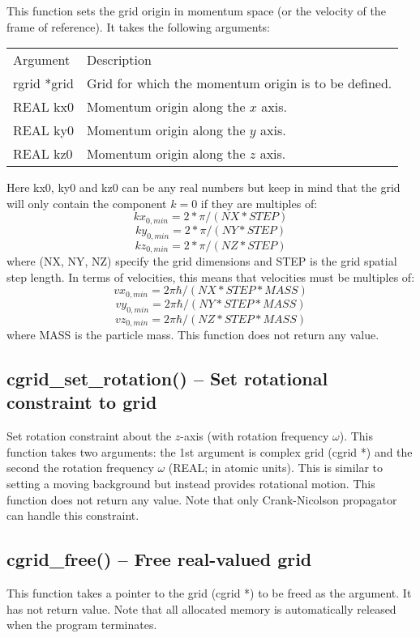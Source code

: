 \documentclass[12pt,letterpaper]{report}
\begin{document}
This function sets the grid origin in momentum space (or the velocity of the frame of reference). It takes the following arguments:
\begin{longtable}{p{} p{}}
Argument & Description\\
\cline{1-2}
rgrid *grid & Grid for which the momentum origin is to be defined.\\
REAL kx0 & Momentum origin along the $x$ axis.\\
REAL ky0 & Momentum origin along the $y$ axis.\\
REAL kz0 & Momentum origin along the $z$ axis.\\
\end{longtable}
\noindent
Here kx0, ky0 and kz0 can be any real numbers but keep in mind that the grid will only contain the component $k = 0$ if they are multiples of:
$$kx_{0,min} = 2 * \pi / (NX * STEP)$$
$$ky_{0,min} = 2 * \pi / (NY * STEP)$$
$$kz_{0,min} = 2 * \pi / (NZ * STEP)$$
\noindent
where (NX, NY, NZ) specify the grid dimensions and STEP is the grid spatial step length. In terms of velocities, this means that velocities must be multiples of:
$$vx_{0,min} = 2\pi\hbar / (NX * STEP * MASS)$$
$$vy_{0,min} = 2\pi\hbar / (NY * STEP * MASS)$$
$$vz_{0,min} = 2\pi\hbar / (NZ * STEP * MASS)$$
where MASS is the particle mass. This function does not return any value.

\subsection{cgrid\_set\_rotation() -- Set rotational constraint to grid}

Set rotation constraint about the $z$-axis (with rotation frequency $\omega$). This function takes two arguments: the 1st argument is complex grid (cgrid *) and the second the rotation frequency $\omega$ (REAL; in atomic units). This is similar to setting a moving background but instead provides rotational motion. This function does not return any value. Note that only Crank-Nicolson propagator can handle this constraint.

\subsection{cgrid\_free() -- Free real-valued grid}

This function takes a pointer to the grid (cgrid *) to be freed as the argument. It has not return value. Note that all allocated memory is automatically released when the program terminates.
\end{document}
